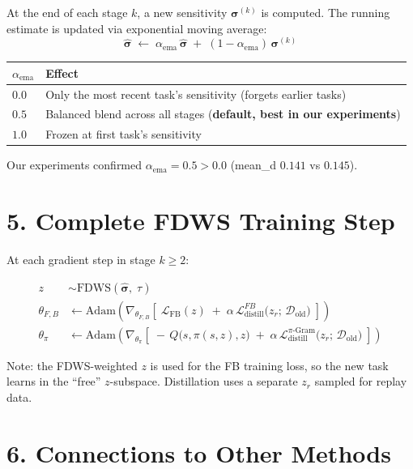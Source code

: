 \documentclass[11pt]{article}
\newcommand{\Dold}{\mathcal{D}_{\text{old}}}
\newcommand{\loss}{\mathcal{L}}
\begin{document}
At the end of each stage $k$, a new sensitivity $\bm{\sigma}^{(k)}$ is computed. The running estimate is updated via exponential moving average:
\[
\hat{\bm{\sigma}} \;\leftarrow\; \alpha_{\mathrm{ema}}\,\hat{\bm{\sigma}} \;+\; (1 - \alpha_{\mathrm{ema}})\,\bm{\sigma}^{(k)}
\]

\begin{center}
\begin{tabular}{ll}
\toprule
$\alpha_{\mathrm{ema}}$ & Effect \\
\midrule
$0.0$ & Only the most recent task's sensitivity (forgets earlier tasks) \\
$0.5$ & Balanced blend across all stages (\textbf{default, best in our experiments}) \\
$1.0$ & Frozen at first task's sensitivity \\
\bottomrule
\end{tabular}
\end{center}

\noindent Our experiments confirmed $\alpha_{\mathrm{ema}} = 0.5 > 0.0$ (mean\_d $0.141$ vs $0.145$).

\section*{5.\; Complete FDWS Training Step}

At each gradient step in stage $k \geq 2$:

\begin{align}
z &\sim \mathrm{FDWS}(\hat{\bm{\sigma}},\;\tau) \tag{weighted z} \\[8pt]
\theta_{F,B} &\leftarrow \mathrm{Adam}\!\left(\nabla_{\theta_{F,B}}\left[\; \loss_{\mathrm{FB}}(z) \;+\; \alpha\,\loss_{\mathrm{distill}}^{FB}\bigl(z_r;\,\Dold\bigr) \;\right]\right) \tag{FB + distill} \\[6pt]
\theta_\pi &\leftarrow \mathrm{Adam}\!\left(\nabla_{\theta_\pi}\left[\; {-}\,Q\bigl(s,\pi(s,z),z\bigr) \;+\; \alpha\,\loss_{\mathrm{distill}}^{\pi\text{-Gram}}\bigl(z_r;\,\Dold\bigr) \;\right]\right) \tag{actor + distill}
\end{align}

\noindent Note: the FDWS-weighted $z$ is used for the FB training loss, so the new task learns in the ``free'' $z$-subspace. Distillation uses a separate $z_r$ sampled for replay data.

\section*{6.\; Connections to Other Methods}
\end{document}
